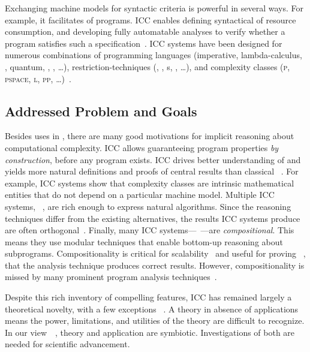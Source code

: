 Exchanging machine models for syntactic criteria is powerful in several ways.
For example, it facilitates  of programs. ICC enables
defining {syntactical}  of resource consumption, and
developing fully automatable analyses to verify whether a program satisfies such
a specification~\cite{heraud2011}. ICC systems have been designed for numerous
combinations of programming languages (imperative,
lambda-calculus, ,
quantum, ,
, \ldots), restriction-techniques (,
, s, , \ldots),
and complexity classes (\textsc{p}, \textsc{pspace}, \textsc{l}, \textsc{pp},
\ldots)~\cite{moyen2017,pchoux2020}.

\subsection{Addressed Problem and Goals}
\label{sec:aicc-goals}

Besides uses in , there are many
good motivations for implicit reasoning about computational complexity. ICC
allows guaranteeing program properties \emph{by construction}, before any
program exists. ICC drives better understanding of  and yields more natural definitions and proofs
of central results than classical ~\cite{kristiansen2017}. For example, ICC systems
show that complexity classes are intrinsic mathematical entities that do not
depend on a particular machine model. Multiple ICC systems,
\eg~\cite{jones2009,marion2011}, are rich enough to express natural algorithms.
Since the reasoning techniques differ from the existing alternatives, the
results ICC systems produce are often orthogonal~\cite{aubert20222}. Finally,
many ICC systems---\eg~\cite{jones2009,marion2011,hainry2023,atkey2024}---are
\emph{compositional}. This means they use modular
techniques that enable bottom-up reasoning about subprograms. Compositionality
is critical for scalability~\cite{carbonneaux2015} and useful for proving
~\cite{keidel2021}, \ie that the analysis technique
produces correct results. However, compositionality is missed by many prominent
program analysis techniques~\cite{carbonneaux2015,schiebel2024}.

Despite this rich inventory of compelling features, ICC has remained largely a
theoretical novelty, with a few exceptions%
~\cite{avanzini2017,avanzini2008,moyen20172,hainry2021,hoffmann2012,feree2018}.
A theory in absence of applications means the power, limitations, and utilities
of the theory are difficult to recognize. In our view~\cite[p.
xxxv]{bishop2003}~\cite[p. 75]{moyen2017}, theory and application are
{symbiotic}. Investigations of both are needed for scientific advancement.

